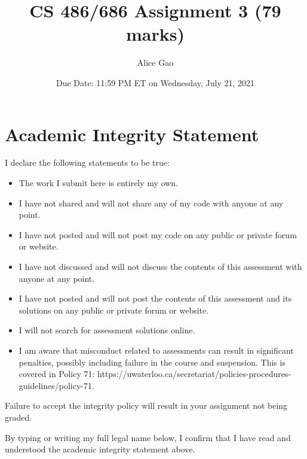\documentclass[12pt]{article}
\title{CS 486/686 Assignment 3 (79 marks)}
\author{Alice Gao}
\date{Due Date: 11:59 PM ET on Wednesday, July 21, 2021}
\begin{document}
\maketitle



\section*{Academic Integrity Statement}

I declare the following statements to be true:

\begin{itemize}
\item 
The work I submit here is entirely my own.

\item 	
I have not shared and will not share any of my code with anyone at any point. 

\item 
I have not posted and will not post my code on any public or private forum or website.

\item 	
I have not discussed and will not discuss the contents of this assessment with anyone at any point.

\item 
I have not posted and will not post the contents of this assessment and its solutions on any public or private forum or website. 

\item 
I will not search for assessment solutions online.

\item 
I am aware that misconduct related to assessments can result in significant penalties, possibly including failure in the course and suspension. This is covered in Policy 71: https://uwaterloo.ca/secretariat/policies-procedures-guidelines/policy-71.
\end{itemize}

Failure to accept the integrity policy will result in your assignment not being graded.

By typing or writing my full legal name below, I confirm that I have read and understood the academic integrity statement above.
\end{document}
